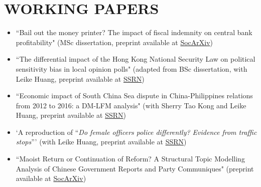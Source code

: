 \documentclass[a4paper,9pt]{extarticle}
\begin{document}
\section*{WORKING PAPERS}
\begin{itemize}
    \item ``Bail out the money printer? The impact of fiscal indemnity on central bank profitability" (MSc dissertation, preprint available at \href{https://doi.org/10.31235/osf.io/wz75m}{SocArXiv})
    \item ``The differential impact of the Hong Kong National Security Law on political sensitivity bias in local opinion polls" (adapted from BSc dissertation, with Leike Huang, preprint available at \href{https://dx.doi.org/10.2139/ssrn.4499460}{SSRN})
    \item ``Economic impact of South China Sea dispute in China-Philippines relations from 2012 to 2016: a DM-LFM analysis" (with Sherry Tao Kong and Leike Huang, preprint available at \href{https://dx.doi.org/10.2139/ssrn.4623476}{SSRN})
    \item `A reproduction of ``\textit{Do female officers police differently? Evidence from traffic stops}”' (with Leike Huang, preprint available at \href{https://dx.doi.org/10.2139/ssrn.4632847}{SSRN})
    \item ``Maoist Return or Continuation of Reform? A Structural Topic Modelling Analysis of Chinese Government Reports and Party Communiques" (preprint available at \href{https://doi.org/10.31235/osf.io/62dvj}{SocArXiv})
\end{itemize}

\end{document}
